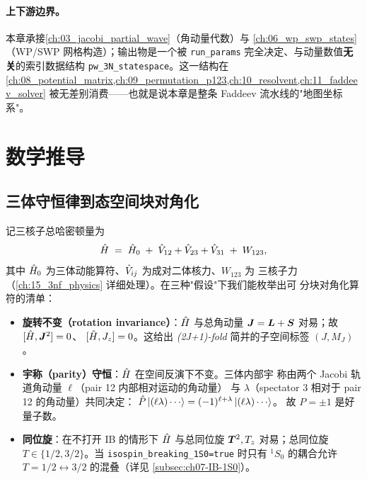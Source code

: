 \paragraph{上下游边界。}
本章承接\cref{ch:03_jacobi_partial_wave}（角动量代数）与
\cref{ch:06_wp_swp_states}（WP/SWP 网格构造）；输出物是一个被
\texttt{run\_params} 完全决定、与动量数值\textbf{无关}的索引数据结构
\texttt{pw\_3N\_statespace}。这一结构在
\cref{ch:08_potential_matrix,ch:09_permutation_p123,ch:10_resolvent,ch:11_faddeev_solver}
被无差别消费——也就是说本章是整条 Faddeev 流水线的"地图坐标系"。

\section{数学推导}
\label{sec:ch07-math}

\subsection{三体守恒律到态空间块对角化}
\label{subsec:ch07-conservation-to-blocks}

记三核子总哈密顿量为
\begin{equation}
\label{eq:ch07-H-decomp}
\hat{H} \;=\; \hat{H}_0 \;+\; \hat{V}_{12} + \hat{V}_{23} + \hat{V}_{31} \;+\; W_{123},
\end{equation}
其中 \(\hat{H}_0\) 为三体动能算符、\(\hat{V}_{ij}\) 为成对二体核力、\(W_{123}\) 为
三核子力（\cref{ch:15_3nf_physics} 详细处理）。在三种"假设"下我们能枚举出可
分块对角化算符的清单：

\begin{itemize}
  \item \textbf{旋转不变（rotation invariance）}：\(\hat{H}\) 与总角动量
        \(\bm{J} = \bm{L} + \bm{S}\) 对易；故 \([\hat{H}, \bm{J}^2] = 0\)、
        \([\hat{H}, J_z] = 0\)。这给出 \emph{(2J+1)-fold} 简并的子空间标签
        \((J, M_J)\)。
  \item \textbf{宇称（parity）守恒}：\(\hat{H}\) 在空间反演下不变。三体内部宇
        称由两个 Jacobi 轨道角动量 \(\ell\)（pair 12 内部相对运动的角动量）
        与 \(\lambda\)（spectator 3 相对于 pair 12 的角动量）共同决定：
        \(\hat{P} \ket{(\ell \lambda) \cdots} = (-1)^{\ell + \lambda}\ket{(\ell \lambda)\cdots}\)。
        故 \(P = \pm 1\) 是好量子数。
  \item \textbf{同位旋}：在不打开 IB 的情形下 \(\hat{H}\) 与总同位旋 \(\bm{T}^2,
        T_z\) 对易；总同位旋 \(T \in \{1/2, 3/2\}\)。当
        \texttt{isospin\_breaking\_1S0=true} 时只有 \({}^1S_0\) 的耦合允许
        \(T = 1/2 \leftrightarrow 3/2\) 的混叠（详见
        \cref{subsec:ch07-IB-1S0}）。
\end{itemize}

